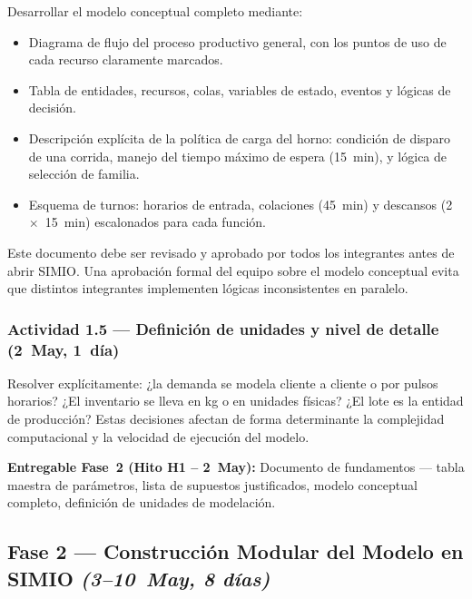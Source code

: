 \documentclass[12pt]{article}
\begin{document}
Desarrollar el modelo conceptual completo mediante:
\begin{itemize}
  \item Diagrama de flujo del proceso productivo general, con los puntos de uso de cada recurso claramente marcados.
  \item Tabla de entidades, recursos, colas, variables de estado, eventos y lógicas de decisión.
  \item Descripción explícita de la política de carga del horno: condición de disparo de una corrida, manejo del tiempo máximo de espera (15~min), y lógica de selección de familia.
  \item Esquema de turnos: horarios de entrada, colaciones (45~min) y descansos (2~$\times$~15~min) escalonados para cada función.
\end{itemize}

Este documento debe ser revisado y aprobado por todos los integrantes antes de abrir SIMIO. Una aprobación formal del equipo sobre el modelo conceptual evita que distintos integrantes implementen lógicas inconsistentes en paralelo.

\subsubsection{Actividad 1.5 --- Definición de unidades y nivel de detalle \quad(2~May, 1~día)}

Resolver explícitamente: ¿la demanda se modela cliente a cliente o por pulsos horarios? ¿El inventario se lleva en kg o en unidades físicas? ¿El lote es la entidad de producción? Estas decisiones afectan de forma determinante la complejidad computacional y la velocidad de ejecución del modelo.

\medskip
\noindent\colorbox{grisclaro}{\parbox{\dimexpr\linewidth-2\fboxsep\relax}{\vspace{2pt}\textbf{Entregable Fase~2 (Hito H1 -- 2~May):} Documento de fundamentos --- tabla maestra de parámetros, lista de supuestos justificados, modelo conceptual completo, definición de unidades de modelación.\vspace{2pt}}}

\subsection{Fase 2 --- Construcción Modular del Modelo en SIMIO \quad\textit{(3--10~May, 8 días)}}
\end{document}
